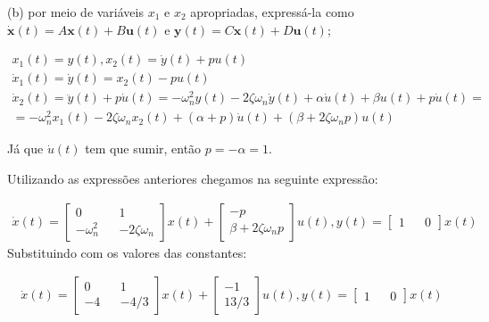 \documentclass[10pt]{article}
\newcommand{\bm}[1]{\boldsymbol{#1}}
\begin{document}
\vspace{\baselineskip}

(b) por meio de variáveis $x_1$ e $x_2$ apropriadas, expressá-la como $\dot{\bm{x}}(t) = A\bm{x}(t) + B\bm{u}(t)$ e $\bm{y}(t) = C\bm{x}(t) + D\bm{u}(t)$;

\begin{align*}
    x_1(t) = y(t), x_2(t) = \dot{y}(t) + pu(t) \\
    \dot{x}_1(t) = \dot{y}(t) = x_2(t) - pu(t) \\
    \dot{x}_2(t) = \ddot{y}(t) + p\dot{u}(t) =  - \omega_n^2 y(t) - 2\zeta \omega_n \dot{y}(t) + \alpha \dot{u}(t) + \beta u(t)+  p \dot{u}(t) = \\
    = - \omega_n^2 x_1(t) -2\zeta \omega_n x_2(t) + (\alpha + p)\dot{u}(t) + (\beta + 2\zeta\omega_n p)u(t) 
\end{align*}

Já que $\dot{u}(t)$ tem que sumir, então $p = - \alpha = 1$.

\vspace{\baselineskip}

Utilizando as expressões anteriores chegamos na seguinte expressão:

\begin{align*}
    \dot{x}(t) =
    \begin{bmatrix}
        0 && 1 \\
        -\omega_n^2 && -2\zeta\omega_n
    \end{bmatrix}
    x(t) +
    \begin{bmatrix}
        -p \\
        \beta + 2 \zeta\omega_n p
    \end{bmatrix}
    u(t), y(t) =
    \begin{bmatrix}
        1 && 0
    \end{bmatrix}
    x(t)
\end{align*}
Substituindo com os valores das constantes:

\begin{align*}
    \dot{x}(t) =
    \begin{bmatrix}
        0 && 1 \\
        -4 && -4/3
    \end{bmatrix}
    x(t) +
    \begin{bmatrix}
        -1 \\
        13/3
    \end{bmatrix}
    u(t), y(t) =
    \begin{bmatrix}
        1 && 0
    \end{bmatrix}
    x(t)
\end{align*}
\end{document}
